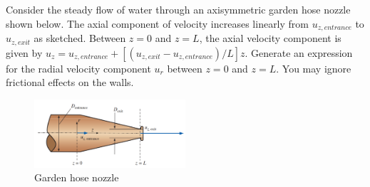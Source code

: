 \section{}
Consider the steady flow of water through an axisymmetric garden hose nozzle shown below. The axial component of velocity increases linearly from $u_{z,entrance}$ to $u_{z,exit}$ as sketched. Between $z = 0$ and $z = L$, the axial velocity component is given by $u_z = u_{z,entrance} + [(u_{z,exit} - u_{z,entrance})/L]z$. Generate an expression for the radial velocity component $u_r$ between $z = 0$ and $z = L$. You may ignore frictional effects on the walls.
\begin{figure}[h]
    \centering
    \includegraphics[width=0.5\textwidth]{Questions/Figures/q3 problem diagram.png}
    \caption{Garden hose nozzle}
\end{figure}

